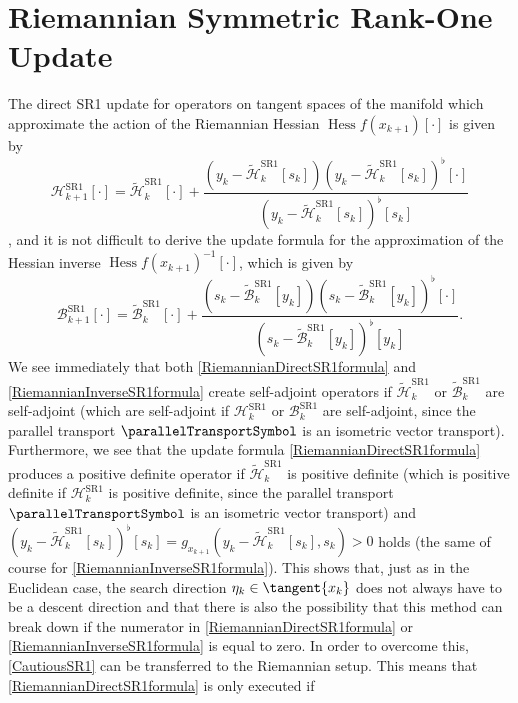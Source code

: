 \section{Riemannian Symmetric Rank-One Update}

The direct SR1 update for operators on tangent spaces of the manifold which approximate the action of the Riemannian Hessian $\operatorname{Hess} f(x_{k+1}) [\cdot]$ is given by 
\begin{equation}\label{RiemannianDirectSR1formula}
    \mathcal{H}^\mathrm{SR1}_{k+1} [\cdot] = \widetilde{\mathcal{H}}^\mathrm{SR1}_k [\cdot] + \frac{(y_k - \widetilde{\mathcal{H}}^\mathrm{SR1}_k [s_k]) (y_k - \widetilde{\mathcal{H}}^\mathrm{SR1}_k [s_k])^{\flat} [\cdot] }{(y_k - \widetilde{\mathcal{H}}^\mathrm{SR1}_k [s_k])^{\flat} [s_k]}
\end{equation}
\cite[p.~18]{Huang:2013}, and it is not difficult to derive the update formula for the approximation of the Hessian inverse ${\operatorname{Hess} f(x_{k+1})}^{-1} [\cdot]$, which is given by 
\begin{equation}\label{RiemannianInverseSR1formula}
    \mathcal{B}^\mathrm{SR1}_{k+1} [\cdot] = \widetilde{\mathcal{B}}^\mathrm{SR1}_k [\cdot] + \frac{(s_k - \widetilde{\mathcal{B}}^\mathrm{SR1}_k [y_k]) (s_k - \widetilde{\mathcal{B}}^\mathrm{SR1}_k [y_k])^{\flat} [\cdot] }{(s_k - \widetilde{\mathcal{B}}^\mathrm{SR1}_k [y_k])^{\flat} [y_k]}.
\end{equation}
We see immediately that both \cref{RiemannianDirectSR1formula} and \cref{RiemannianInverseSR1formula} create self-adjoint operators if $\widetilde{\mathcal{H}}^\mathrm{SR1}_k$ or $\widetilde{\mathcal{B}}^\mathrm{SR1}_k$ are self-adjoint (which are self-adjoint if $\mathcal{H}^\mathrm{SR1}_k$ or $\mathcal{B}^\mathrm{SR1}_k$ are self-adjoint, since the parallel transport $\parallelTransportSymbol$ is an isometric vector transport). Furthermore, we see that the update formula \cref{RiemannianDirectSR1formula} produces a positive definite operator if $\widetilde{\mathcal{H}}^\mathrm{SR1}_k$ is positive definite (which is positive definite if $\mathcal{H}^\mathrm{SR1}_k$ is positive definite, since the parallel transport $\parallelTransportSymbol$ is an isometric vector transport) and $(y_k - \widetilde{\mathcal{H}}^\mathrm{SR1}_k [s_k])^{\flat} [s_k] = g_{x_{k+1}}(y_k - \widetilde{\mathcal{H}}^\mathrm{SR1}_k [s_k], s_k) >0$ holds (the same of course for \cref{RiemannianInverseSR1formula}). This shows that, just as in the Euclidean case, the search direction $\eta_k \in \tangent{x_k}$ does not always have to be a descent direction and that there is also the possibility that this method can break down if the numerator in \cref{RiemannianDirectSR1formula} or \cref{RiemannianInverseSR1formula} is equal to zero. In order to overcome this, \cref{CautiousSR1} can be transferred to the Riemannian setup. This means that \cref{RiemannianDirectSR1formula} is only executed if
